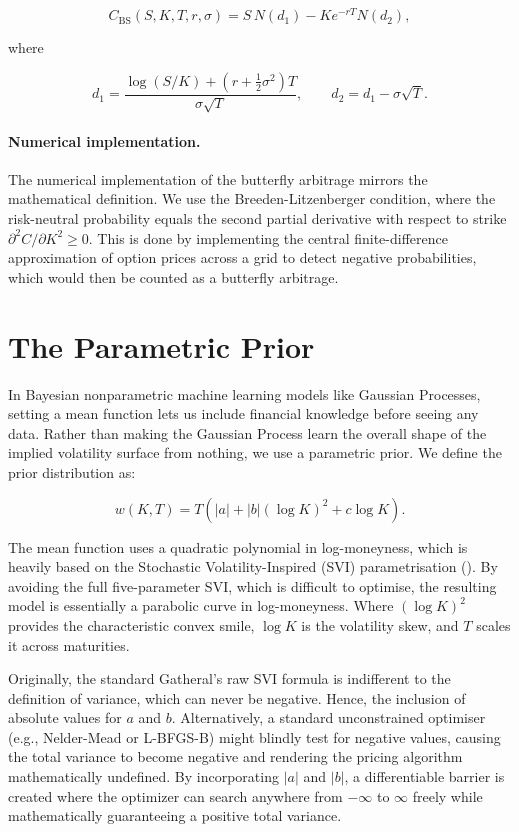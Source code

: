 \documentclass[12pt,oneside]{report}
\theoremstyle{definition}
\theoremstyle{remark}
\begin{document}
$$ C_{\mathrm{BS}}(S,K,T,r,\sigma) = S\,N(d_1) - K e^{-rT}N(d_2),$$

where

$$d_1 = \frac{\log(S/K) + (r + \tfrac12\sigma^2)T}{\sigma\sqrt{T}}, \qquad d_2 = d_1 - \sigma\sqrt{T}. $$

\paragraph{Numerical implementation.}
The numerical implementation of the butterfly arbitrage mirrors the mathematical definition. We use the Breeden-Litzenberger condition, where the risk-neutral probability equals the second partial derivative with respect to strike $\partial^2 C/\partial K^2\geq 0$. This is done by implementing the central finite-difference approximation of option prices across a grid to detect negative probabilities, which would then be counted as a butterfly arbitrage. 

\section{The Parametric Prior}
In Bayesian nonparametric machine learning models like Gaussian Processes, setting a mean function lets us include financial knowledge before seeing any data. Rather than making the Gaussian Process learn the overall shape of the implied volatility surface from nothing, we use a parametric prior.
We define the prior distribution as:

\begin{equation}
w(K,T) = T\left(|a| + |b|(\log K)^2 + c \log K\right).
\label{parametric_prior}
\end{equation}

The mean function uses a quadratic polynomial in log-moneyness, which is heavily based on the Stochastic Volatility-Inspired (SVI) parametrisation (\citet{gatheral2014arbitrage}). By avoiding the full five-parameter SVI, which is difficult to optimise, the resulting model is essentially a parabolic curve in log-moneyness. Where $(\log K)^2$ provides the characteristic convex smile, $\log K$ is the volatility skew, and $T$ scales it across maturities.

Originally, the standard Gatheral's raw SVI formula is indifferent to the definition of variance, which can never be negative. Hence, the inclusion of absolute values for $a$ and $b$. Alternatively, a standard unconstrained optimiser (e.g., Nelder-Mead or L-BFGS-B) might blindly test for negative values, causing the total variance to become negative and rendering the pricing algorithm mathematically undefined. By incorporating $|a|$ and $|b|$, a differentiable barrier is created where the optimizer can search anywhere from $-\infty$ to $\infty$ freely while mathematically guaranteeing a positive total variance.
\end{document}

